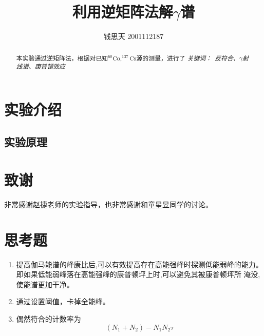 \documentclass{article}
\title{利用逆矩阵法解$\gamma$谱}
\author{钱思天 2001112187}
\begin{document}
    \maketitle
    \begin{abstract}
        本实验通过逆矩阵法，根据对已知$^{60}\text{Co},^{137}\text{Cs}$源的测量，进行了
        \newline
        \newline
        {\emph{ 关键词：\ 反符合、$\gamma$射线谱、康普顿效应 }\rm}

    \end{abstract}

    \section{实验介绍}
    \subsection{实验原理}
  

\section{致谢}
    非常感谢赵捷老师的实验指导，也非常感谢和童星昱同学的讨论。
    \clearpage
    \appendix
    \appendixpage
    \section{思考题}
    \begin{enumerate}
        \item 提高伽马能谱的峰康比后,可以有效提高存在高能强峰时探测低能弱峰的能力。即如果低能弱峰落在高能强峰的康普顿坪上时,可以避免其被康普顿坪所
        淹没,使能谱更加干净。
        \item 通过设置阈值，卡掉全能峰。
        \item 偶然符合的计数率为
        \begin{equation}
            (N_1+N_2)-N_1N_2\tau
        \end{equation}
    \end{enumerate}
\end{document}
